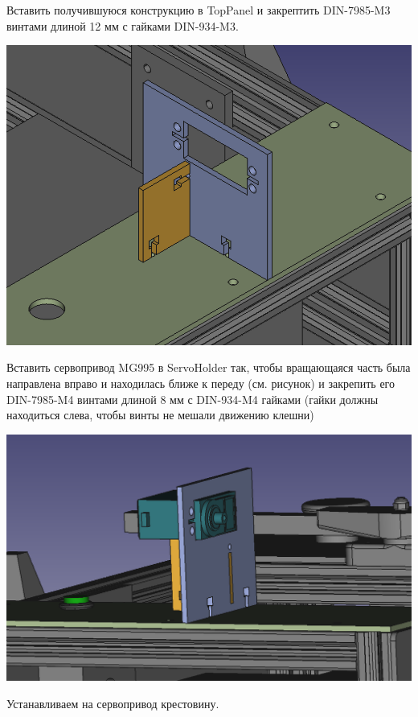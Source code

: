 \documentclass[12pt,a4paper,oneside]{article}
\begin{document}
Вставить получившуюся конструкцию в TopPanel и закрептить DIN-7985-M3 винтами
длиной 12 мм с гайками DIN-934-M3.

\includegraphics[width=\textwidth]{servoholder-toppanel}

Вставить сервопривод MG995 в ServoHolder так, чтобы вращающаяся часть была
направлена вправо и находилась ближе к переду (см. рисунок) и закрепить его
DIN-7985-M4 винтами длиной 8 мм с DIN-934-M4 гайками (гайки должны находиться слева, чтобы
винты не мешали движению клешни)

\includegraphics[width=\textwidth]{installedservo}

Устанавливаем на сервопривод крестовину. 
\end{document}
